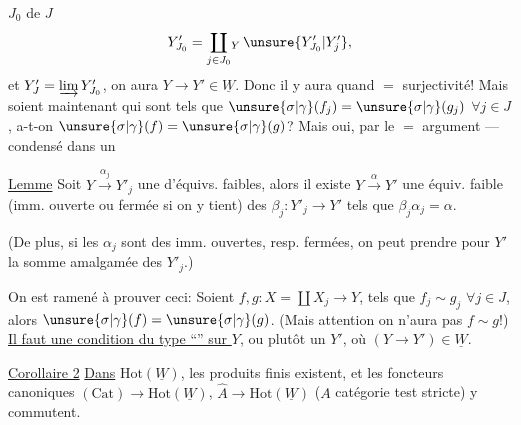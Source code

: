 $J_0$ de $J$
\[
Y'_{J_0}=\coprod_{j\in J_0}\!{}_Y\,\unsure{Y'_{J_0}|Y'_j},
\]
et $Y'_J=\varinjlim Y'_{J_0}$, on aura $Y\longrightarrow Y'\in\underline W$. Donc il y aura quand $=$ surjectivité! Mais soient maintenant
qui  sont tels que $\unsure{\sigma|\gamma}(f_j)=\unsure{\sigma|\gamma}(g_j)$ $\forall j\in J$, a-t-on $\unsure{\sigma|\gamma}(f)=\unsure{\sigma|\gamma}(g)$? Mais oui, par le $=$ argument --- condensé dans un


\uline{Lemme} Soit $Y\xrightarrow{\alpha_j}Y'_j$  une  d'équivs. faibles, alors il existe $Y\xrightarrow{\alpha}Y'$ une équiv. faible   (imm. ouverte ou fermée si on y tient)  des $\beta_j:Y'_j\longrightarrow Y'$ tels que $\beta_j\alpha_j=\alpha$.


(De plus, si les $\alpha_j$ sont des imm. ouvertes, resp. fermées, on peut prendre pour $Y'$ la somme amalgamée des $Y'_j$.)

On est ramené à prouver ceci: Soient $f,g:X=\coprod X_j\longrightarrow Y$, tels que $f_j\sim g_j$ $\forall j\in J$, alors $\unsure{\sigma|\gamma}(f)=\unsure{\sigma|\gamma}(g)$. (Mais attention on n'aura pas $f\sim g$!) \uline{Il faut une condition du type ``'' sur $Y$}, ou plutôt un $Y'$, où $(Y\longrightarrow Y')\in\underline W$.

\uline{Corollaire 2} \uline{Dans} $\mathrm{Hot}(\underline W)$, les produits finis existent, et les foncteurs canoniques $(\mathrm{Cat})\longrightarrow\mathrm{Hot}(\underline W)$, $\widehat A\longrightarrow\mathrm{Hot}(\underline W)$ ($A$ catégorie test stricte) y commutent.

